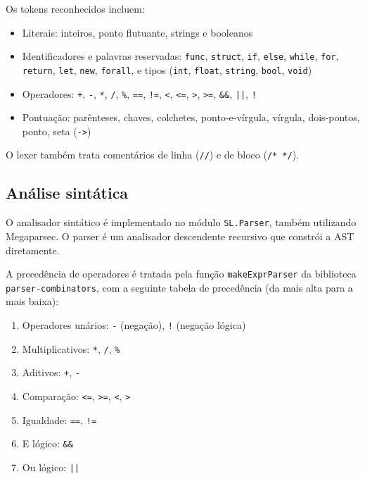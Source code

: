 \documentclass[12pt,a4paper]{article}
\begin{document}
Os tokens reconhecidos incluem:
\begin{itemize}
    \item Literais: inteiros, ponto flutuante, strings e booleanos
    \item Identificadores e palavras reservadas: \texttt{func}, \texttt{struct}, \texttt{if}, \texttt{else}, \texttt{while}, \texttt{for}, \texttt{return}, \texttt{let}, \texttt{new}, \texttt{forall}, e tipos (\texttt{int}, \texttt{float}, \texttt{string}, \texttt{bool}, \texttt{void})
    \item Operadores: \texttt{+}, \texttt{-}, \texttt{*}, \texttt{/}, \texttt{\%}, \texttt{==}, \texttt{!=}, \texttt{<}, \texttt{<=}, \texttt{>}, \texttt{>=}, \texttt{\&\&}, \texttt{||}, \texttt{!}
    \item Pontuação: parênteses, chaves, colchetes, ponto-e-vírgula, vírgula, dois-pontos, ponto, seta (\texttt{->})
\end{itemize}

O lexer também trata comentários de linha (\texttt{//}) e de bloco (\texttt{/* */}).

\subsection{Análise sintática}

O analisador sintático é implementado no módulo \texttt{SL.Parser}, também utilizando Megaparsec. O parser é um analisador descendente recursivo que constrói a AST diretamente.

A precedência de operadores é tratada pela função \texttt{makeExprParser} da biblioteca \texttt{parser-combinators}, com a seguinte tabela de precedência (da mais alta para a mais baixa):

\begin{enumerate}
    \item Operadores unários: \texttt{-} (negação), \texttt{!} (negação lógica)
    \item Multiplicativos: \texttt{*}, \texttt{/}, \texttt{\%}
    \item Aditivos: \texttt{+}, \texttt{-}
    \item Comparação: \texttt{<=}, \texttt{>=}, \texttt{<}, \texttt{>}
    \item Igualdade: \texttt{==}, \texttt{!=}
    \item E lógico: \texttt{\&\&}
    \item Ou lógico: \texttt{||}
\end{enumerate}
\end{document}
